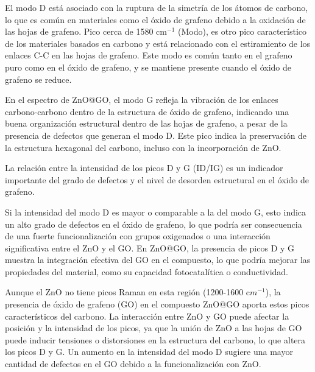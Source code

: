 \documentclass[12pt]{article}
\begin{document}
El modo D está asociado con la ruptura de la simetría de los átomos de carbono, lo que es común en materiales como el óxido de grafeno debido a la oxidación de las hojas de grafeno.
Pico cerca de 1580 cm$\displaystyle ^{-1}$ (Modo), es otro pico característico de los materiales basados en carbono y está relacionado con el estiramiento de los enlaces C-C en las hojas de grafeno. Este modo es común tanto en el grafeno puro como en el óxido de grafeno, y se mantiene presente cuando el óxido de grafeno se reduce.\vspace{1em} %

En el espectro de ZnO@GO, el modo G refleja la vibración de los enlaces carbono-carbono dentro de la estructura de óxido de grafeno, indicando una buena organización estructural dentro de las hojas de grafeno, a pesar de la presencia de defectos que generan el modo D.
Este pico indica la preservación de la estructura hexagonal del carbono, incluso con la incorporación de ZnO. 

La relación entre la intensidad de los picos D y G (ID/IG) es un indicador importante del grado de defectos y el nivel de desorden estructural en el óxido de grafeno.\vspace{1em} %

Si la intensidad del modo D es mayor o comparable a la del modo G, esto indica un alto grado de defectos en el óxido de grafeno, lo que podría ser consecuencia de una fuerte funcionalización con grupos oxigenados o una interacción significativa entre el ZnO y el GO.
En ZnO@GO, la presencia de picos D y G muestra la integración efectiva del GO en el compuesto, lo que podría mejorar las propiedades del material, como su capacidad fotocatalítica o conductividad.\vspace{1em} %

Aunque el ZnO no tiene picos Raman en esta región (1200-1600 c$m^{-1}$), la presencia de óxido de grafeno (GO) en el compuesto ZnO@GO aporta estos picos característicos del carbono.
La interacción entre ZnO y GO puede afectar la posición y la intensidad de los picos, ya que la unión de ZnO a las hojas de GO puede inducir tensiones o distorsiones en la estructura del carbono, lo que altera los picos D y G. Un aumento en la intensidad del modo D sugiere una mayor cantidad de defectos en el GO debido a la funcionalización con ZnO.
\vspace{1em} %
\end{document}
